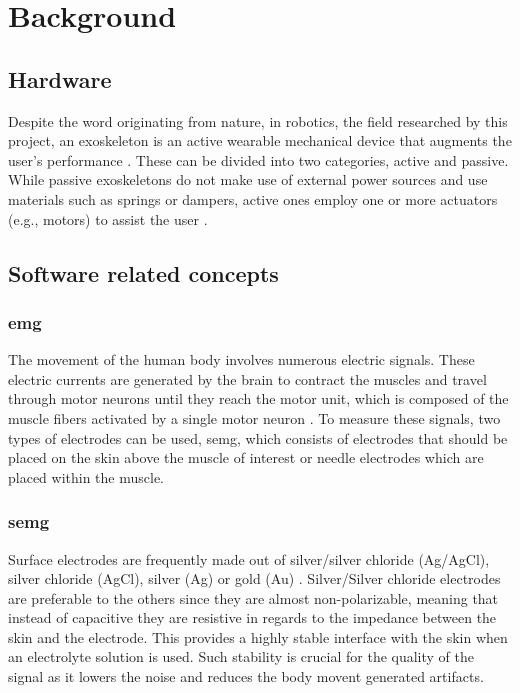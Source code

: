 \section{Background}
\label{section:background}

\subsection{Hardware}

Despite the word originating from nature, in robotics, the field researched by this project, an exoskeleton is an active wearable 
mechanical device that augments the user's performance \cite{exodefinition}. These can be divided into two categories, active and passive. 
While passive exoskeletons do not make use of external power sources and use materials such as springs or dampers, active ones employ 
one or more actuators (e.g., motors) to assist the user \cite{passiveactiveexo}.


\subsection{Software related concepts}

\subsubsection{\acf{emg}}

The movement of the human body involves numerous electric signals. These electric currents are generated by the brain
to contract the muscles and travel through motor neurons until they reach the motor unit, which is composed of the muscle fibers
activated by a single motor neuron \cite{emggen}. To measure these signals, two types of electrodes can be used, \ac{semg}, 
which consists of electrodes that should be placed on the skin above the muscle of interest or needle electrodes which are placed within 
the muscle. 

\subsubsection{\acf{semg}}

Surface electrodes are frequently made out of silver/silver chloride (Ag/AgCl), silver chloride (AgCl), silver (Ag) or gold (Au) \cite{sEMG}.
Silver/Silver chloride electrodes are preferable to the others since they are almost non-polarizable, meaning that instead of capacitive
they are resistive in regards to the impedance between the skin and the electrode. This provides a highly stable interface with the skin when 
an electrolyte solution is used. Such stability is crucial for the quality of the signal as it lowers the noise and reduces the body movent generated
artifacts.

